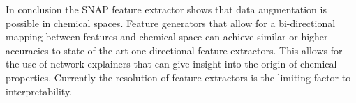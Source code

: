 In conclusion the SNAP feature extractor shows that data augmentation is possible in chemical spaces.
Feature generators that allow for a bi-directional mapping between features and chemical space can achieve similar or higher
accuracies to state-of-the-art one-directional feature extractors.
This allows for the use of network explainers that can give insight into the origin of chemical properties.
Currently the resolution of feature extractors is the limiting factor to interpretability.